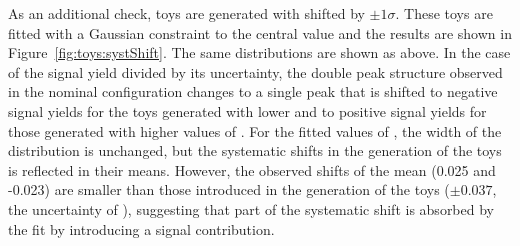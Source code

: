 As an additional check, toys are generated with \Rsfof shifted by $\pm1\sigma$. These toys are fitted with a Gaussian constraint to the central value and the results are shown in Figure~\ref{fig:toys:systShift}. The same distributions are shown as above. In the case of the signal yield divided by its uncertainty, the double peak structure observed in the nominal configuration changes to a single peak that is shifted to negative signal yields for the toys generated with lower and to positive signal yields for those generated with higher values of \Rsfof. For the fitted values of \Rsfof, the width of the distribution is unchanged, but the systematic shifts in the generation of the toys is reflected in their means. However, the observed shifts of the mean (0.025 and -0.023) are smaller than those introduced in the generation of the toys ($\pm0.037$, the uncertainty of \Rsfof), suggesting that part of the systematic shift is absorbed by the fit by introducing a signal contribution.
